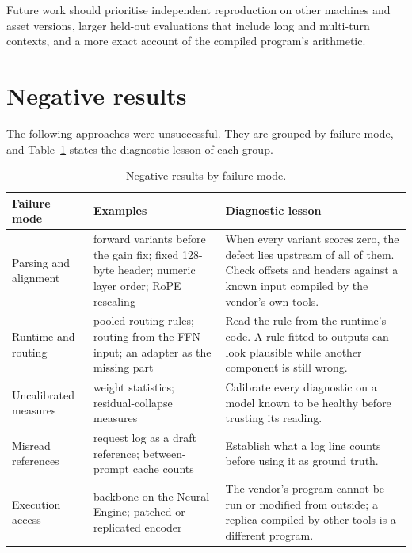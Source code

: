 \documentclass[11pt,reqno]{amsart}
\theoremstyle{definition}
\begin{document}
Future work should prioritise independent reproduction on other machines and asset versions, larger held-out evaluations that include long and multi-turn contexts, and a more exact account of the compiled program's arithmetic.

\appendix
\section{Negative results}\label{sec:negative}

The following approaches were unsuccessful. They are grouped by failure mode, and Table~\ref{tab:neg} states the diagnostic lesson of each group.

\begin{table}[!htbp]
\centering\small
\begin{tabular}{@{}p{34mm}p{50mm}p{72mm}@{}}
\toprule
Failure mode & Examples & Diagnostic lesson \\
\midrule
Parsing and alignment & forward variants before the gain fix; fixed 128-byte header; numeric layer order; RoPE rescaling & When every variant scores zero, the defect lies upstream of all of them. Check offsets and headers against a known input compiled by the vendor's own tools. \\
Runtime and routing & pooled routing rules; routing from the FFN input; an adapter as the missing part & Read the rule from the runtime's code. A rule fitted to outputs can look plausible while another component is still wrong. \\
Uncalibrated measures & weight statistics; residual-collapse measures & Calibrate every diagnostic on a model known to be healthy before trusting its reading. \\
Misread references & request log as a draft reference; between-prompt cache counts & Establish what a log line counts before using it as ground truth. \\
Execution access & backbone on the Neural Engine; patched or replicated encoder & The vendor's program cannot be run or modified from outside; a replica compiled by other tools is a different program. \\
\bottomrule
\end{tabular}
\caption{Negative results by failure mode.}\label{tab:neg}
\end{table}
\end{document}
